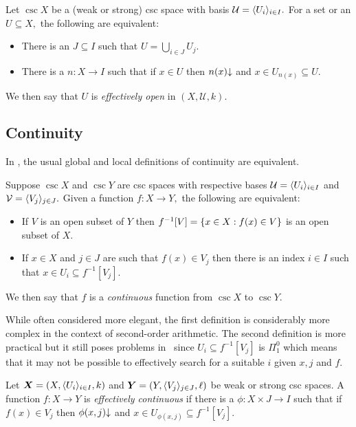 \documentclass[csc]{subfiles}
\begin{document}
\begin{propositiondefinition}[\RCA]\label{P:EffOpen}\label{D:EffOpen}
  Let \(\csc{X}\) be a \textup(weak or strong\textup) csc space with basis \(\mathcal{U}=\langle U_i\rangle_{i \in I}.\)
  For a set or an \eset{} \(U \subseteq X,\) the following are equivalent:
  \begin{itemize}
  \item There is an \eset{} \(J \subseteq I\) such that \(U = \bigcup_{i \in J} U_j.\)
  \item There is a \pfun{} \(n:X \to I\) such that if \(x \in U\) then \(n(x){\downarrow}\) and \(x \in U_{n(x)} \subseteq U.\)
  \end{itemize}
  We then say that \(U\) is \emph{effectively open} in \((X,\mathcal{U},k).\)
\end{propositiondefinition}

\subsection*{Continuity}

In \ACA, the usual global and local definitions of continuity are equivalent.

\begin{theorem*}[\ACA]
  Suppose \(\csc{X}\) and \(\csc{Y}\) are csc spaces with respective bases \(\mathcal{U}=\langle U_i\rangle_{i\in I}\) and \(\mathcal{V}=\langle V_j\rangle_{j \in J}.\)
  Given a function \(f:X \to Y,\) the following are equivalent:
  \begin{itemize}
  \item If \(V\) is an open subset of \(Y\) then \(f^{-1}[V] = \lbrace x \in X: f(x) \in V\rbrace\) is an open subset of \(X.\)
  \item If \(x \in X\) and \(j \in J\) are such that \(f(x) \in V_j\) then there is an index \(i \in I\) such that \(x \in U_i \subseteq f^{-1}[V_j].\)
  \end{itemize}
  We then say that \(f\) is a \emph{continuous} function from \(\csc{X}\) to \(\csc{Y}.\)
\end{theorem*}

\noindent
While often considered more elegant, the first definition is considerably more complex in the context of second-order arithmetic.
The second definition is more practical but it still poses problems in \RCA\ since \(U_i \subseteq f^{-1}[V_j]\) is \(\Pi^0_1\) which means that it may not be possible to effectively search for a suitable \(i\) given \(x,j\) and \(f.\)

\begin{definition}[\RCA]\label{D:EffContinuous}
  Let \(\boldsymbol{X}=(X,\langle U_i\rangle_{i\in I},k)\) and \(\boldsymbol{Y}=(Y,\langle V_j\rangle_{j\in J},\ell)\) be weak or strong csc spaces.
  A function \(f:X \to Y\) is \emph{effectively continuous} if there is a \pfun{} \(\phi:X \times J \to I\) such that if \(f(x) \in V_j\) then \(\phi(x,j){\downarrow}\) and \(x \in U_{\phi(x,j)} \subseteq f^{-1}[V_j].\)
\end{definition}
\end{document}

